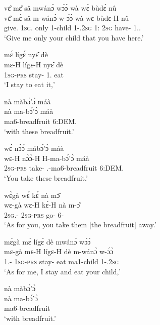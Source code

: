 \begin{exe}[(N234)]
\exN\label{n63}
  \glll  vɛ̂ mɛ̂ sâ mwánɔ̀ wɔ́ɔ̀ wà wɛ̀ bùdɛ́ nû\\
         vɛ̂ mɛ̀ sâ m-wánɔ̀ w-ɔ́ɔ̀ wà wɛ bùdɛ-H nû\\
          give.{\IMP}  1\textsc{sg}.{\OBJ} only {\N}1-child 1-{\POSS}.2\textsc{sg} 1:{\ATT}  2\textsc{sg} have-{\R} 1.{\DEM}.{\PROX}\\
    \trans `Give me only your child that you have here.'
 
\exN\label{n64}
  \glll  mɛ́ lígɛ́ nyɛ̂ dè \\
        mɛ-H lígɛ-H nyɛ̂ dè \\
         1\textsc{sg}-\textsc{prs} stay-{\R} 1.{\OBJ} eat   \\
    \trans `I stay to eat it,'
 
\exN\label{n65}
  \glll  nà màbɔ́'ɔ̀ máà \\
         nà ma-bɔ́'ɔ̀ máà \\
         {\COM} ma6-breadfruit 6:DEM.{\PROX} \\
    \trans `with these breadfruit.'
 
\exN\label{n66}
  \glll wɛ́ nɔ̀ɔ́ mábɔ́'ɔ̀ máà \\
       wɛ-H nɔ̀ɔ̀-H H-ma-bɔ́'ɔ̀ máà \\
         2\textsc{sg}-\textsc{prs} take-{\R} {\OBJ}.{\LINK}-ma6-breadfruit 6:DEM.{\PROX} \\
    \trans `You take these breadfruit.'
 
\exN\label{n67}
  \glll wɛ̀gà wɛ́ kɛ́ nà mɔ̂ \\
       wɛ-gà wɛ-H kɛ̀-H nà m-ɔ̂ \\
          2\textsc{sg}.{\SBJ}-{\CONTR} 2\textsc{sg}-\textsc{prs} go-{\R} {\COM} 6-{\OBJ}  \\
    \trans `As for you, you take them [the breadfruit] away.'
 
\exN\label{n68}
  \glll  mɛ̀gà mɛ́ lígɛ́ dè mwánɔ̀ wɔ́ɔ̀ \\
        mɛ-gà mɛ-H lígɛ-H dè m-wánɔ̀ w-ɔ́ɔ̀ \\
          1.{\SBJ}-{\CONTR} 1\textsc{sg}-\textsc{prs} stay-{\R} eat ma1-child 1-{\POSS}.2\textsc{sg}  \\
    \trans `As for me, I stay and eat your child,'
 
\exN\label{n69}
  \glll nà màbɔ́'ɔ̀ \\
        nà ma-bɔ́'ɔ̀ \\
         {\COM} ma6-breadfruit \\
    \trans `with breadfruit.'
 

\end{exe}
